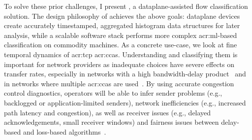 To solve these prior challenges, I present \seidr{}, a dataplane-assisted flow classification solution.
The design philosophy of \seidr{} achieves the above goals: dataplane devices create accurately timestamped, aggregated histogram data structures for later analysis, while a scalable software stack performs more complex \gls{acr:ml}-based classification on commodity machines.
As a concrete use-case, we look at fine temporal dynamics of \gls{acr:tcp} \glspl{acr:cca}.
Understanding and classifying them is important for network providers as inadequate choices have severe effects on transfer rates, especially in networks with a high bandwidth-delay product~\parencite{DBLP:journals/queue/CardwellCGYJ16} and in networks where multiple \glspl{acr:cca} are used~\parencite{DBLP:conf/imc/WareMSS19}. 
By using accurate congestion control diagnostics, operators will be able to infer sender problems (e.g., backlogged or application-limited senders), network inefficiencies (e.g., increased path latency and congestion), as well as receiver issues (e.g., delayed acknowledgements, small receiver windows) and fairness issues between delay-based and loss-based algorithms~\parencite{DBLP:conf/imc/WareMSS19}.


